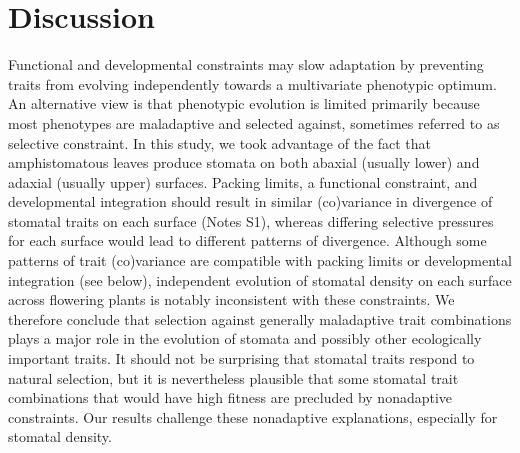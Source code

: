 \documentclass[
  12pt,
]{article}
\begin{document}
\hypertarget{discussion}{%
\section{Discussion}\label{discussion}}

Functional and developmental constraints may slow adaptation by preventing traits from evolving independently towards a multivariate phenotypic optimum. An alternative view is that phenotypic evolution is limited primarily because most phenotypes are maladaptive and selected against, sometimes referred to as selective constraint. In this study, we took advantage of the fact that amphistomatous leaves produce stomata on both abaxial (usually lower) and adaxial (usually upper) surfaces. Packing limits, a functional constraint, and developmental integration should result in similar (co)variance in divergence of stomatal traits on each surface (Notes S1), whereas differing selective pressures for each surface would lead to different patterns of divergence. Although some patterns of trait (co)variance are compatible with packing limits or developmental integration (see below), independent evolution of stomatal density on each surface across flowering plants is notably inconsistent with these constraints. We therefore conclude that selection against generally maladaptive trait combinations plays a major role in the evolution of stomata and possibly other ecologically important traits. It should not be surprising that stomatal traits respond to natural selection, but it is nevertheless plausible that some stomatal trait combinations that would have high fitness are precluded by nonadaptive constraints. Our results challenge these nonadaptive explanations, especially for stomatal density.
\end{document}
